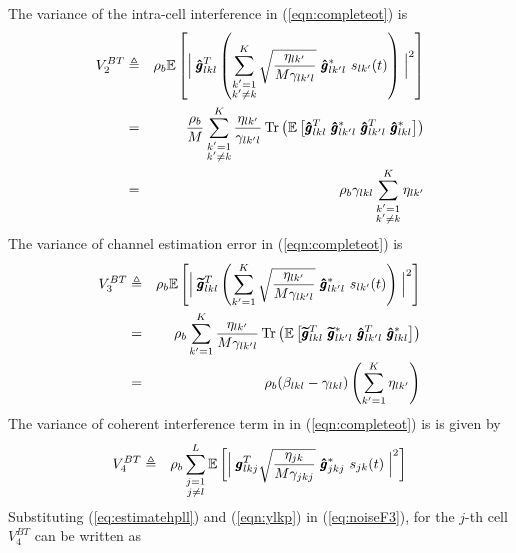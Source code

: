 \documentclass[10pt, a4paper, twoside,fleqn]{article}
\DeclareMathOperator{\Tr}{Tr}
\begin{document}
The variance of the intra-cell interference in (\ref{eqn:completeot})  is
\begin{eqnarray}\label{eq:noiseF2}
	V_2^{BT} &\triangleq& \rho_b \mathbb{E}\left[\Bigm| \pmb{\hat g}^T_{lkl}  \left(\sum_{\substack{k'=1 \\ k' \neq k}}^{K} \sqrt{\frac{\eta_{lk'}}{M\gamma_{lk'l}}} \ \pmb{\hat g}^*_{lk'l} \ s_{lk'} (t)\right)\Bigm|^2\right] \nonumber \\
        &=& \frac{\rho_b}{M} \sum_{\substack{k'=1 \\ k' \neq k}}^{K}\frac{\eta_{lk'}}{\gamma_{lk'l}} \Tr\left(\mathbb{E}\left[ \pmb{\hat g}^T_{lkl} \ \pmb{\hat g}_{lk'l}^* \ \pmb{\hat g}^T_{lk'l} \ \pmb{\hat g}_{lkl}^{*} \right]\right) \nonumber \\
	    &=&  \rho_b\gamma_{lkl}\sum\limits_{\substack{k'=1\\ k'\neq k}}^{K}\eta_{lk'}
\end{eqnarray}
The variance of channel estimation error in (\ref{eqn:completeot}) is
\begin{eqnarray}\label{eqn:noiseF4}
	V_3^{BT} &\triangleq& \rho_b \mathbb{E} \left[ \Bigm | \pmb{\widetilde{g}}_{lkl}^T \left(\sum_{k'=1}^{K} \sqrt{\frac{\eta_{lk'}}{M\gamma_{lk'l}}} \ \pmb{\hat g}^*_{lk'l} \ s_{lk'} (t)\right)\Bigm|^2 \right] \nonumber \\
     &=& \rho_b\sum_{k'=1}^{K} \frac{\eta_{lk'}}{M\gamma_{lk'l}} \Tr\left(\mathbb{E}\left[\pmb{\widetilde{g}}^T_{lkl} \ \pmb{\widetilde{g}}_{lk'l}^* \ \pmb{\hat g}_{lk'l}^T \ \pmb{\hat g}_{lkl}^{*} \right]\right) \nonumber \\
        &=& \rho_b(\beta_{lkl}-\gamma_{lkl})\left(\sum\limits_{k'=1}^{K}\eta_{lk'}\right)
\end{eqnarray}
The variance of coherent interference term in  in (\ref{eqn:completeot}) is is given by
\begin{eqnarray}\label{eq:noiseF3}
	V_4^{BT} &\triangleq& \rho_b \sum_{\substack{j=1 \\ j \neq l}}^{L}\mathbb{E}\left[\Bigm| \pmb{g}_{lkj}^T \sqrt{\frac{\eta_{jk}}{M\gamma_{jkj}}} \ \pmb{\hat g}^*_{jkj} \ s_{jk} (t)\Bigm|^2\right] 
\end{eqnarray}
Substituting (\ref{eq:estimatehpll}) and (\ref{eqn:ylkp}) in (\ref{eq:noiseF3}), for the $j$-th cell $V_4^{BT}$ can be written as
\end{document}
